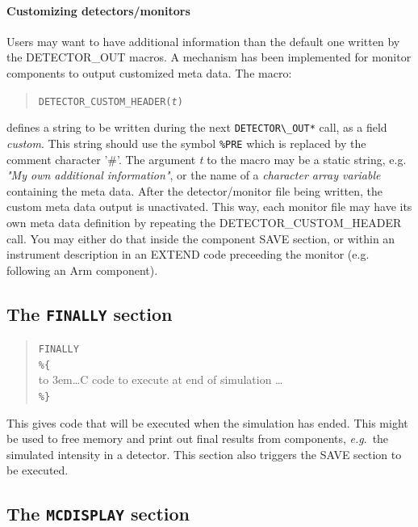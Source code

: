 \paragraph{Customizing detectors/monitors}

Users may want to have additional information than the default one written by the DETECTOR\_OUT macros. A mechanism has been implemented for monitor components to output customized meta data. The macro:

\begin{quote}
  \texttt{DETECTOR\_CUSTOM\_HEADER(\textit{t})}
\end{quote}

defines a string to be written during the next \verb+DETECTOR\_OUT*+ call, as a field \textit{custom}. This string should use the symbol \verb+%PRE+ which is replaced by
the comment character '\#'. The argument \textit{t} to the macro may be a static string, e.g. \textit{"My own additional information"}, or the name of a \textit{character array variable} containing the meta data. After
the detector/monitor file being written, the custom meta data output is unactivated. This way, each monitor file may have its own meta data definition by repeating the
DETECTOR\_CUSTOM\_HEADER call. You may either do that inside the component SAVE section, or within an instrument description in an EXTEND code preceeding the monitor (e.g.
following an Arm component).

\subsection{The \texttt{FINALLY} section}
\label{s:comp-finally}

\begin{quote}
  \texttt{FINALLY} \\
  \verb|%{| \\
  \hbox to 3em{}\ldots C code to execute at end of simulation \ldots \\
  \verb|%}|
\end{quote}
This gives code that will be executed when the simulation has
ended. This might be used to free memory and print out final results from components, \textit{e.g}.\ the
simulated intensity in a detector. This section also triggers the SAVE section to be executed.

\subsection{The \texttt{MCDISPLAY} section}
\label{s:comp-mcdisplay}

